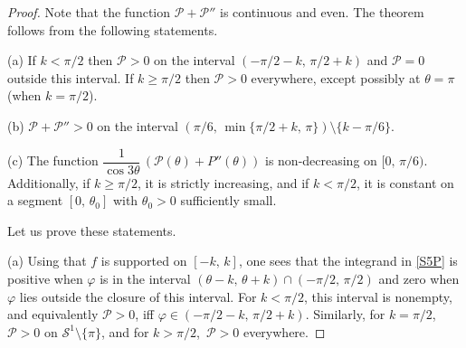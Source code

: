 \documentclass[10pt,a4paper]{amsart}
\newcommand {\PPP}{\mathcal{P}}
\newcommand {\SSS}{\mathcal{S}^1}
\begin{document}
\begin{proof}
Note that the function $\PPP+\PPP''$ is continuous and even. The theorem follows from the following statements.
\vspace{2mm}

(a) If $k < \pi/2$ then $\PPP>0$ on the interval $(-\pi/2-k,\, \pi/2+k)$ and $\PPP=0$ outside this interval. If $k \ge \pi/2$ then $\PPP>0$ everywhere, except possibly at $\theta=\pi$ (when $k=\pi/2$).
\vspace{2mm}

(b) $\PPP + \PPP'' > 0$ on the interval $(\pi/6,\, \min\{\pi/2 + k,\, \pi \}) \setminus \{ k-\pi/6 \}$.
\vspace{2mm}

(c) The function $\dfrac{1}{\cos 3\theta}\,(\PPP(\theta) + P''(\theta))$ is non-decreasing on $[0,\, \pi/6)$. Additionally, if $k \ge \pi/2$, it is strictly increasing, and if $k < \pi/2$, it is constant on a segment $[0,\, \theta_0]$ with $\theta_0>0$ sufficiently small.
\vspace{2mm}

Let us prove these statements.\vspace{2mm}

(a) Using that $f$ is supported on $[-k,\, k]$, one sees that the integrand in \eqref{S5P} is positive when $\varphi$ is in the interval $(\theta-k,\, \theta+k) \cap (-\pi/2,\, \pi/2)$ and zero when $\varphi$ lies outside the closure of this interval. For $k < \pi/2$, this interval is nonempty, and equivalently $\PPP>0$, iff $\varphi \in (-\pi/2-k,\, \pi/2+k)$. Similarly, for $k=\pi/2$,\, $\PPP>0$ on $\SSS \setminus \{ \pi \}$, and for $k> \pi/2$,\, $\PPP>0$ everywhere.
\vspace{2mm}


\end{proof}
\end{document}
